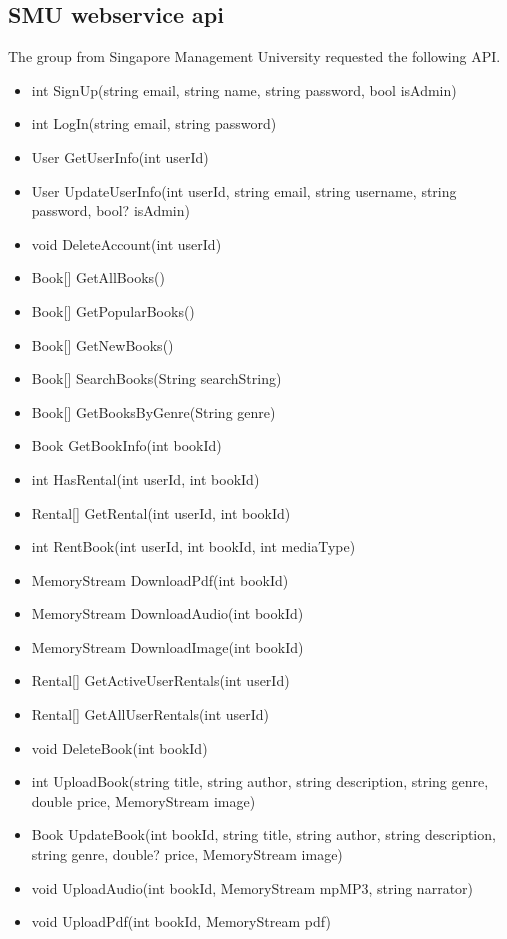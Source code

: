 \documentclass[a4paper,11pt,report]{article}
\begin{document}
\subsection{SMU webservice api}
The group from Singapore Management University requested the following API.

\begin{itemize}
	\item int SignUp(string email, string name, string password, bool isAdmin)
	\item int LogIn(string email, string password)
	\item User GetUserInfo(int userId)
	\item User UpdateUserInfo(int userId, string email, string username, string password, bool? isAdmin)
	\item void DeleteAccount(int userId)
	\item Book[] GetAllBooks()
	\item Book[] GetPopularBooks()
	\item Book[] GetNewBooks()
	\item Book[] SearchBooks(String searchString)
	\item Book[] GetBooksByGenre(String genre)
	\item Book GetBookInfo(int bookId)
	\item int HasRental(int userId, int bookId)
	\item Rental[] GetRental(int userId, int bookId)
	\item int RentBook(int userId, int bookId, int mediaType)
	\item MemoryStream DownloadPdf(int bookId)
	\item MemoryStream DownloadAudio(int bookId)
	\item MemoryStream DownloadImage(int bookId)
	\item Rental[] GetActiveUserRentals(int userId)
	\item Rental[] GetAllUserRentals(int userId)
	\item void DeleteBook(int bookId)
	\item int UploadBook(string title, string author, string description, string genre, double price, MemoryStream image)
	\item Book UpdateBook(int bookId, string title, string author, string description, string genre, double? price, MemoryStream image)
	\item void UploadAudio(int bookId, MemoryStream mpMP3, string narrator)
	\item void UploadPdf(int bookId, MemoryStream pdf)
\end{itemize}
\end{document}
